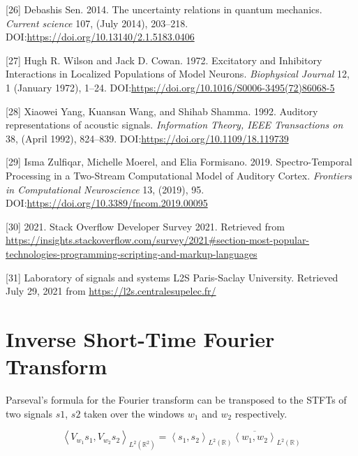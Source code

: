 \documentclass[american,]{article}
\theoremstyle{definition}
\theoremstyle{definition}
\theoremstyle{definition}
\theoremstyle{remark}
\begin{document}
\leavevmode\hypertarget{ref-sen2014}{}%
{[}26{]} Debashis Sen. 2014. The uncertainty relations in quantum mechanics. \emph{Current science} 107, (July 2014), 203--218. DOI:\url{https://doi.org/10.13140/2.1.5183.0406}

\leavevmode\hypertarget{ref-wilson1972}{}%
{[}27{]} Hugh R. Wilson and Jack D. Cowan. 1972. Excitatory and Inhibitory Interactions in Localized Populations of Model Neurons. \emph{Biophysical Journal} 12, 1 (January 1972), 1--24. DOI:\url{https://doi.org/10.1016/S0006-3495(72)86068-5}

\leavevmode\hypertarget{ref-yang1992}{}%
{[}28{]} Xiaowei Yang, Kuansan Wang, and Shihab Shamma. 1992. Auditory representations of acoustic signals. \emph{Information Theory, IEEE Transactions on} 38, (April 1992), 824--839. DOI:\url{https://doi.org/10.1109/18.119739}

\leavevmode\hypertarget{ref-zulfiqar2019}{}%
{[}29{]} Isma Zulfiqar, Michelle Moerel, and Elia Formisano. 2019. Spectro-Temporal Processing in a Two-Stream Computational Model of Auditory Cortex. \emph{Frontiers in Computational Neuroscience} 13, (2019), 95. DOI:\url{https://doi.org/10.3389/fncom.2019.00095}

\leavevmode\hypertarget{ref-so_survey2021}{}%
{[}30{]} 2021. Stack Overflow Developer Survey 2021. Retrieved from \url{https://insights.stackoverflow.com/survey/2021\#section-most-popular-technologies-programming-scripting-and-markup-languages}

\leavevmode\hypertarget{ref-l2s}{}%
{[}31{]} Laboratory of signals and systems L2S Paris-Saclay University. Retrieved July 29, 2021 from \url{https://l2s.centralesupelec.fr/}

\pagebreak

\hypertarget{appendix-appendix}{%
\appendix}


\hypertarget{istft}{%
\section{Inverse Short-Time Fourier Transform}\label{istft}}

Parseval's formula for the Fourier transform can be transposed
to the STFTs of two signals \(s1\), \(s2\) taken over the windows \(w_1\) and \(w_2\) respectively.

\begin{equation}
\left\langle V_{w_1}s_1,V_{w_2}s_2\right\rangle_{L^2(\mathbb{R}^2)} =
    \left\langle s_1,s_2\right\rangle_{L^2(\mathbb{R})} \overline{\left\langle w_1,w_2\right\rangle}_{L^2(\mathbb{R})}
\end{equation}
\end{document}
